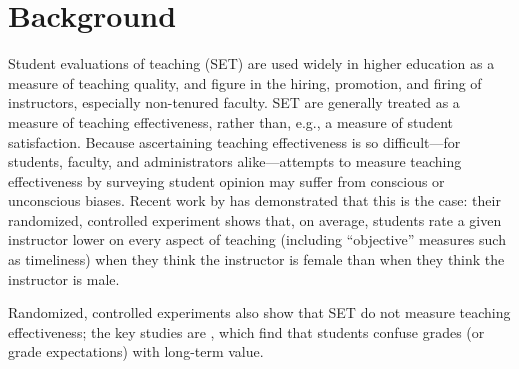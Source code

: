 \documentclass[12pt]{article}
\begin{document}
\section{Background}
Student evaluations of teaching (SET) are used widely in higher education 
as a measure of teaching quality,
and figure in the hiring, promotion, and firing of instructors, especially non-tenured faculty.
SET are generally treated as a measure of teaching effectiveness, rather than, e.g., a measure of student satisfaction.
Because ascertaining teaching effectiveness is so difficult---for students,
faculty, and administrators alike---attempts to measure teaching effectiveness by
surveying student opinion may suffer from conscious or unconscious biases. 
Recent work by \citet{MacNell2014} has demonstrated that this is the case: 
their randomized, controlled experiment shows that, on average, students rate a given instructor
lower on every aspect of teaching (including ``objective'' measures such as
timeliness) when they think the instructor is female than when 
they think the instructor is male.

Randomized, controlled experiments also show that SET do not measure
teaching effectiveness; the key studies are \citet{Carrell2010a,Braga2014},
which find that students confuse grades (or grade expectations) with long-term
value.
\end{document}
